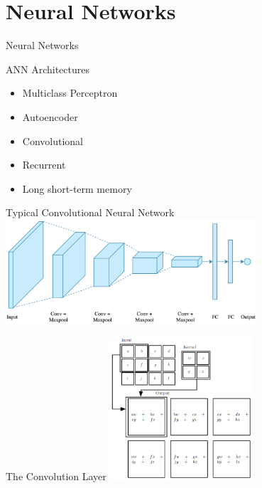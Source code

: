 \setlength{\parskip}{\baselineskip}
\section{Neural Networks}

\begin{frame}
	\huge Neural Networks
\end{frame}

\begin{frame}{ANN Architectures}
	\begin{itemize}
		\item Multiclass Perceptron
		\item Autoencoder
		\item Convolutional
		\item Recurrent
		\item Long short-term memory
	\end{itemize}
\end{frame}

\begin{frame}{Typical Convolutional Neural Network}
	\centering
	\includegraphics[width=0.7\textwidth]{../Images/CNNArchitectures/typical-cnn-architecture.png}\\
\end{frame}

\begin{frame}{The Convolution Layer}
	\centering
	\includegraphics[width=0.4\textwidth]{../Images/CNNArchitectures/convolution-operation.png}\\
\end{frame}

